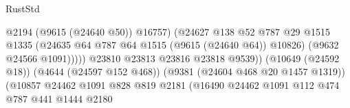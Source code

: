 \begin{lexlean}{RustStd}
\begin{coremodule}
                                                            @2194
                                                            (@9615 (@24640 @50))
                                                            @16757)
                                                          (@24627
                                                            @138
                                                            @52
                                                            @787
                                                            @29
                                                            @1515
                                                            @1335
                                                            (@24635
                                                              @64
                                                              @787
                                                              @64
                                                              @1515
                                                              (@9615 (@24640 @64))
                                                              @10826)
                                                            (@9632 @24566 @1091)))))
                                                    @23810
                                                    @23813
                                                    @23816
                                                    @23818
                                                    @9539))
                                                (@10649 (@24592 @18))
                                                (@4644 (@24597 @152 @468))
                                                (@9381 (@24604 @468 @20 @1457 @1319))
                                                (@10857
                                                  @24462
                                                  @1091
                                                  @828
                                                  @819
                                                  @2181
                                                  (@16490
                                                    @24462
                                                    @1091
                                                    @112
                                                    @474
                                                    @787
                                                    @441
                                                    @1444
                                                    @2180

\end{coremodule}
\end{lexlean}
